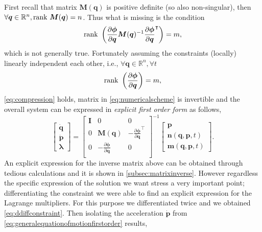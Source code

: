 		First recall that matrix $\bm{M}(\bm{q})$ is positive definite (so also non-singular), then $\forall\bm{q}\in\mathbb{R}^{n}, \mathrm{rank}~\bm{M}(\bm{q}) = n$. Thus what is missing is the condition 
		\begin{equation}
			\label{eq:compression}
			\mathrm{rank}~\left( \frac{\partial\bm{\phi}}{\partial\bm{q}}\bm{M}(\bm{q})^{-1}\frac{\partial\bm{\phi}}{\partial\bm{q}}^{\intercal}\right) = m,
		\end{equation}
		which is not generally true. Fortunately assuming the constraints (locally) linearly independent each other, i.e., $\forall\bm{q}\in\mathbb{R}^{n},\forall t$
		\begin{equation}
			\label{eq:independentcondition}
			\mathrm{rank}~\left(\frac{\partial\bm{\phi}}{\partial\bm{q}}\right) = m, 
		\end{equation}
		\cref{eq:compression} holds, matrix in \cref{eq:numericalscheme} is invertible and the overall system can be expressed in \emph{explicit first order form} as follows,
		\begin{equation*}
			\begin{bmatrix}
				\dot{\bm{q}}\\
				\dot{\bm{p}}\\
				\bm{\lambda}
			\end{bmatrix}
			= 
			\begin{bmatrix}
				\bm{I} 	&	0		&	0 \\
				0	& 	\bm{M}(\bm{q}) 	&	-\frac{\partial\bm{\phi}}{\partial\bm{q}}^{\intercal} \\
				0 	& -\frac{\partial\bm{\phi}}{\partial\bm{q}} & 0\\
			\end{bmatrix}^{-1}
			\begin{bmatrix}
				\bm{p} \\
				\bm{n}(\bm{q},\bm{p},t) \\
				\bm{m}(\bm{q},\bm{p},t)
			\end{bmatrix}.
		\end{equation*}
		An explicit expression for the inverse matrix above can be obtained through tedious calculations and it is shown in \cref{subsec:matrixinverse}. However regardless the specific expression of the solution we want stress a very important point; differentiating the constraint we were able to find an explicit expression for the Lagrange multipliers. For this purpose we differentiated twice and we obtained \cref{eq:ddiffconstraint}. Then isolating the acceleration $\bm{\dot{p}}$ from \cref{eq:generalequationofmotionfirstorder} results,
